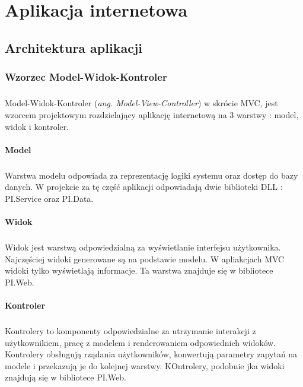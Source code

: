 \chapter{Aplikacja internetowa}
\section{Architektura aplikacji} %
\label{sec:architektura_aplikacji}

\subsection{Wzorzec Model-Widok-Kontroler} %
\label{sub:wzorzec_model_widok_kontroler}
\paragraph{} %
\label{par:paragraph_name}
Model-Widok-Kontroler (\textit{ang. Model-View-Controller}) w skrócie MVC, jest wzorcem projektowym rozdzielający aplikację internetową na 3 warstwy : model, widok i kontroler. 

\subsubsection{Model}
\paragraph{}
Warstwa modelu odpowiada za reprezentację logiki systemu oraz dostęp do bazy danych. W projekcie za tę część aplikacji odpowiadają dwie biblioteki DLL : PI.Service oraz PI.Data.

\subsubsection{Widok}
\paragraph{}
Widok jest warstwą odpowiedzialną za wyświetlanie interfejsu użytkownika. Najczęściej widoki generowane są na podstawie modelu. W apliakcjach MVC widoki tylko wyświetlają informacje. Ta warstwa znajduje się w bibliotece PI.Web.

\subsubsection{Kontroler}
\paragraph{} 
Kontrolery to komponenty odpowiedzialne za utrzymanie interakcji z użytkownikiem, pracę z modelem i renderowaniem odpowiednich widoków. Kontrolery obsługują rządania użytkowników, konwertują parametry zapytań na modele i przekazują je do kolejnej warstwy. KOntrolery, podobnie jka widoki znajdują się w bibliotece PI.Web.  

